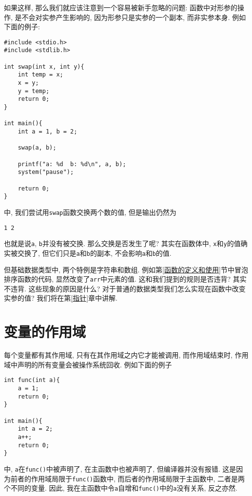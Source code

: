         如果这样, 那么我们就应该注意到一个容易被新手忽略的问题: 函数中对形参的操作, 是不会对实参产生影响的, 因为形参只是实参的一个副本, 而非实参本身. 例如下面的例子:
\begin{lstlisting}
#include <stdio.h>
#include <stdlib.h>

int swap(int x, int y){
    int temp = x;
    x = y;
    y = temp;
    return 0;
}

int main(){
    int a = 1, b = 2;

    swap(a, b);
    
    printf("a: %d  b: %d\n", a, b);
    system("pause");

    return 0;
}
\end{lstlisting}
        中, 我们尝试用\texttt{swap}函数交换两个数的值, 但是输出仍然为
\begin{lstlisting}
1 2
\end{lstlisting}

        也就是说\texttt{a}, \texttt{b}并没有被交换. 那么交换是否发生了呢? 其实在函数体中, \texttt{x}和\texttt{y}的值确实被交换了, 但它们只是\texttt{a}和\texttt{b}的副本, 不会影响\texttt{a}和\texttt{b}的值.

        但基础数据类型中, 两个特例是字符串和数组. 例如第\ref{函数的定义和使用}节中冒泡排序函数的代码, 显然改变了\texttt{arr}中元素的值. 这和我们提到的规则是否违背? 其实不违背. 这些现象的原因是什么? 对于普通的数据类型我们怎么实现在函数中改变实参的值? 我们将在第\ref{指针}章中讲解.

    \section{变量的作用域} \label{变量的作用域}
        每个变量都有其作用域, 只有在其作用域之内它才能被调用, 而作用域结束时, 作用域中声明的所有变量会被操作系统回收. 例如下面的例子
\begin{lstlisting}
int func(int a){
    a = 1;
    return 0;
}

int main(){
    int a = 2;
    a++;
    return 0;
}
\end{lstlisting}
        中, \texttt{a}在\texttt{func()}中被声明了, 在主函数中也被声明了, 但编译器并没有报错. 这是因为前者的作用域局限于\texttt{func()}函数中, 而后者的作用域局限于主函数中, 二者是两个不同的变量. 因此, 我在主函数中令\texttt{a}自增和\texttt{func()}中的\texttt{a}没有关系, 反之亦然.


